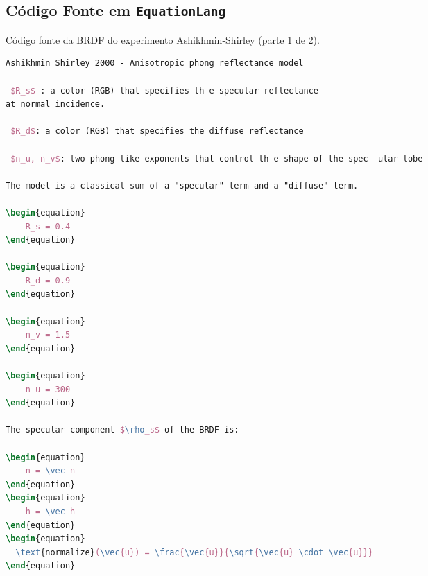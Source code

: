 \subsection{Código Fonte em \texttt{EquationLang}}
\begin{codigo}[H]
    \caption{\small Código fonte da BRDF do experimento Ashikhmin-Shirley (parte 1 de 2).}
    \label{cod-ashikhmin-shirley-close-to-original-eqlang-pt-1}
\begin{lstlisting}[language=tex, frame=none, inputencoding=utf8]
Ashikhmin Shirley 2000 - Anisotropic phong reflectance model

 $R_s$ : a color (RGB) that specifies th e specular reflectance
at normal incidence.

 $R_d$: a color (RGB) that specifies the diffuse reflectance

 $n_u, n_v$: two phong-like exponents that control th e shape of the spec- ular lobe

The model is a classical sum of a "specular" term and a "diffuse" term.

\begin{equation}
    R_s = 0.4
\end{equation}

\begin{equation}
    R_d = 0.9
\end{equation}

\begin{equation}
    n_v = 1.5
\end{equation}

\begin{equation}
    n_u = 300
\end{equation}

The specular component $\rho_s$ of the BRDF is:

\begin{equation}
    n = \vec n
\end{equation}
\begin{equation}
    h = \vec h
\end{equation}
\begin{equation}
  \text{normalize}(\vec{u}) = \frac{\vec{u}}{\sqrt{\vec{u} \cdot \vec{u}}}
\end{equation}
\end{lstlisting}
\end{codigo}



